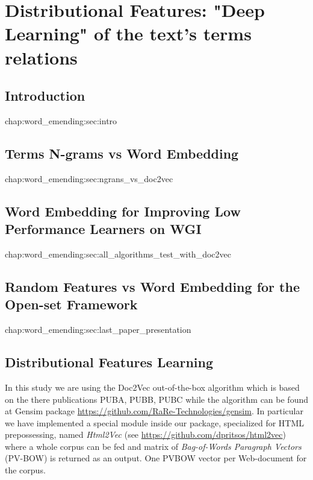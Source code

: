 
\chapter{Distributional Features: "Deep Learning" of the text's terms relations}

\label{chap:relevant_work}


\newcommand{\keyword}[1]{\textbf{#1}}
\newcommand{\tabhead}[1]{\textbf{#1}}
\newcommand{\code}[1]{\texttt{#1}}
\newcommand{\file}[1]{\texttt{\bfseries#1}}
\newcommand{\option}[1]{\texttt{\itshape#1}}


\section{Introduction}{chap:word_emending:sec:intro}

\section{Terms N-grams vs Word Embedding}{chap:word_emending:sec:ngrans_vs_doc2vec}


\section{Word Embedding for Improving Low Performance Learners on WGI}{chap:word_emending:sec:all_algorithms_test_with_doc2vec}


\section{Random Features vs Word Embedding for the Open-set Framework}{chap:word_emending:sec:last_paper_presentation}



\section{Distributional Features Learning}\label{sec:Gensim}

In this study we are using the Doc2Vec out-of-the-box algorithm which is based on the there publications PUBA, PUBB, PUBC while the algorithm can be found at Gensim package \url{https://github.com/RaRe-Technologies/gensim}. In particular we have implemented a special module inside our package, specialized for HTML prepossessing, named \textit{Html2Vec} (see \url{https://github.com/dpritsos/html2vec}) where a whole corpus can be fed and matrix of \textit{Bag-of-Words Paragraph Vectors} (PV-BOW) is returned as an output. One PVBOW vector per Web-document for the corpus.

